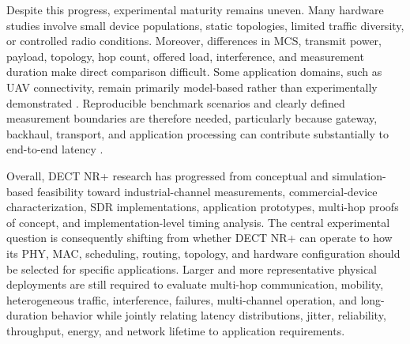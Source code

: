 Despite this progress, experimental maturity remains uneven. Many hardware
studies involve small device populations, static topologies, limited traffic
diversity, or controlled radio conditions. Moreover, differences in MCS,
transmit power, payload, topology, hop count, offered load, interference, and
measurement duration make direct comparison difficult. Some application
domains, such as UAV connectivity, remain primarily model-based rather than
experimentally demonstrated
\cite{jahangirAnalysisPerformanceDECT2024}. Reproducible benchmark scenarios
and clearly defined measurement boundaries are therefore needed, particularly
because gateway, backhaul, transport, and application processing can contribute
substantially to end-to-end latency
\cite{piresDECT2020NREnergy2026b}.

Overall, DECT NR+ research has progressed from conceptual and simulation-based
feasibility toward industrial-channel measurements, commercial-device
characterization, SDR implementations, application prototypes, multi-hop
proofs of concept, and implementation-level timing analysis. The central
experimental question is consequently shifting from whether DECT NR+ can
operate to how its PHY, MAC, scheduling, routing, topology, and hardware
configuration should be selected for specific applications. Larger and more
representative physical deployments are still required to evaluate multi-hop
communication, mobility, heterogeneous traffic, interference, failures,
multi-channel operation, and long-duration behavior while jointly relating
latency distributions, jitter, reliability, throughput, energy, and network
lifetime to application requirements.